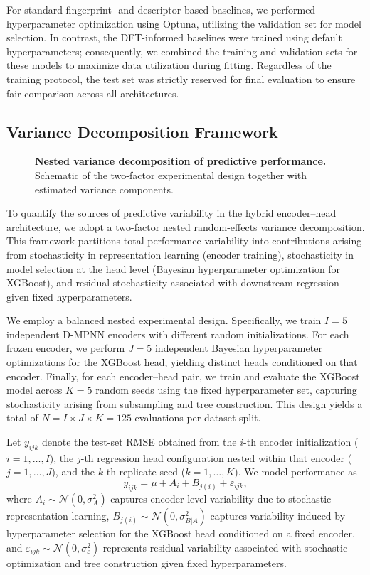 For standard fingerprint- and descriptor-based baselines, we performed hyperparameter optimization using Optuna, utilizing the validation set for model selection. In contrast, the DFT-informed baselines were trained using default hyperparameters; consequently, we combined the training and validation sets for these models to maximize data utilization during fitting. Regardless of the training protocol, the test set was strictly reserved for final evaluation to ensure fair comparison across all architectures.

\subsection{Variance Decomposition Framework}
\label{subsec:var-decomp}

\begin{figure}[ht]
    \centering
    
    \caption{\textbf{Nested variance decomposition of predictive performance.}
    Schematic of the two-factor experimental design together with estimated variance components.}
    \label{fig:nested_anova_design}
\end{figure}
To quantify the sources of predictive variability in the hybrid encoder--head architecture, we adopt a two-factor nested random-effects variance decomposition. This framework partitions total performance variability into contributions arising from stochasticity in representation learning (encoder training), stochasticity in model selection at the head level (Bayesian hyperparameter optimization for XGBoost), and residual stochasticity associated with downstream regression given fixed hyperparameters.

We employ a balanced nested experimental design. Specifically, we train $I = 5$ independent D-MPNN encoders with different random initializations. For each frozen encoder, we perform $J = 5$ independent Bayesian hyperparameter optimizations for the XGBoost head, yielding distinct heads conditioned on that encoder. Finally, for each encoder--head pair, we train and evaluate the XGBoost model across $K = 5$ random seeds using the fixed hyperparameter set, capturing stochasticity arising from subsampling and tree construction. This design yields a total of $N = I \times J \times K = 125$ evaluations per dataset split.

Let $y_{ijk}$ denote the test-set RMSE obtained from the $i$-th encoder initialization ($i = 1, \dots, I$), the $j$-th regression head configuration nested within that encoder ($j = 1, \dots, J$), and the $k$-th replicate seed ($k = 1, \dots, K$). We model performance as
\begin{equation}
y_{ijk} = \mu + A_i + B_{j(i)} + \varepsilon_{ijk},
\end{equation}
where $A_i \sim \mathcal{N}(0, \sigma_A^2)$ captures encoder-level variability due to stochastic representation learning, $B_{j(i)} \sim \mathcal{N}(0, \sigma_{B|A}^2)$ captures variability induced by hyperparameter selection for the XGBoost head conditioned on a fixed encoder, and $\varepsilon_{ijk} \sim \mathcal{N}(0, \sigma_\varepsilon^2)$ represents residual variability associated with stochastic optimization and tree construction given fixed hyperparameters.

